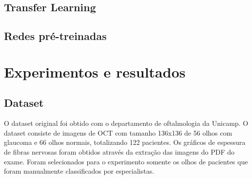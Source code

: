 \documentclass[conference]{IEEEtran}
\begin{document}
  \subsection{Transfer Learning}


  \subsection{Redes pré-treinadas}


\section{Experimentos e resultados}




  \subsection{Dataset}


  O dataset original foi obtido com o departamento de oftalmologia da Unicamp. O dataset consiste de imagens de OCT com tamanho 136x136 de 56 olhos com glaucoma e 66 olhos normais, totalizando 122 pacientes. Os gráficos de espessura de fibras nervosas foram obtidos através da extração das imagens do PDF do exame. Foram selecionados para o experimento somente os olhos de pacientes que foram manualmente classificados por especialistas.
\end{document}
